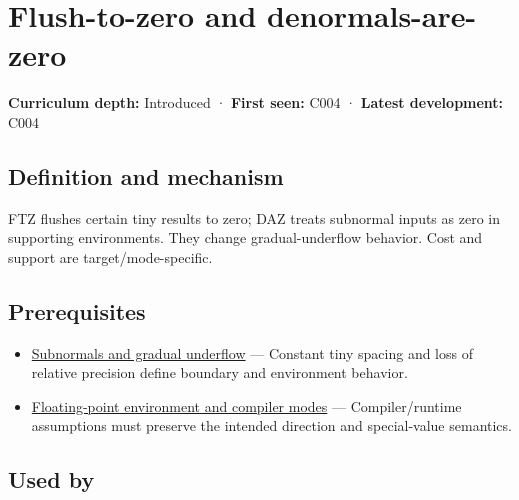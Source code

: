 \hypertarget{appendix-e979eb012782}{}\label{referencestart:appendix-e979eb012782}
\section{Flush-to-zero and denormals-are-zero}\label{appendix-e979eb012782-flush-to-zero-and-denormals-are-zero}

\hypertarget{appendix-e979eb012782-flush-to-zero-and-denormals-are-zero}{}

\textbf{Curriculum depth:} Introduced · \textbf{First seen:} C004 · \textbf{Latest development:} C004

\begin{allmightroledefinition}

\subsection{Definition and mechanism}\label{appendix-e979eb012782-definition-and-mechanism}

\hypertarget{appendix-e979eb012782-definition-and-mechanism}{}

FTZ flushes certain tiny results to zero; DAZ treats subnormal inputs as zero in supporting environments. They change gradual-underflow behavior. Cost and support are target/mode-specific.

\end{allmightroledefinition}

\subsection{Prerequisites}\label{appendix-e979eb012782-prerequisites}

\hypertarget{appendix-e979eb012782-prerequisites}{}

\begin{itemize}
\tightlist
\item
  \hyperref[appendix-00a6e044c437]{Subnormals and gradual underflow} --- Constant tiny spacing and loss of relative precision define boundary and environment behavior.
\item
  \hyperref[appendix-f11d1a521253]{Floating-point environment and compiler modes} --- Compiler/runtime assumptions must preserve the intended direction and special-value semantics.
\end{itemize}

\subsection{Used by}\label{appendix-e979eb012782-used-by}


